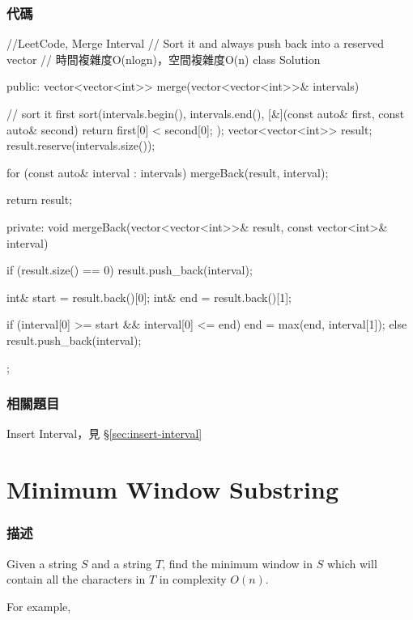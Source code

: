 \subsubsection{代碼}
\begin{Code}
//LeetCode, Merge Interval
// Sort it and always push back into a reserved vector
// 時間複雜度O(nlogn)，空間複雜度O(n)
class Solution {
public:
    vector<vector<int>> merge(vector<vector<int>>& intervals) {
        // sort it first
        sort(intervals.begin(), intervals.end(), [&](const auto& first, const auto& second)
             {
                return first[0] < second[0];
             });
        vector<vector<int>> result;
        result.reserve(intervals.size());

        for (const auto& interval : intervals)
            mergeBack(result, interval);

        return result;
    }
private:
    void mergeBack(vector<vector<int>>& result, const vector<int>& interval) {
        if (result.size() == 0) result.push_back(interval);

        int& start = result.back()[0];
        int& end = result.back()[1];

        if (interval[0] >= start && interval[0] <= end)
            end = max(end, interval[1]);
        else
            result.push_back(interval);
    }
};
\end{Code}


\subsubsection{相關題目}

\begindot
\item Insert Interval，見 \S \ref{sec:insert-interval}
\myenddot


\section{Minimum Window Substring} %
\label{sec:minimum-window-substring}


\subsubsection{描述}
Given a string $S$ and a string $T$, find the minimum window in $S$ which will contain all the characters in $T$ in complexity $O(n)$.

For example, 

